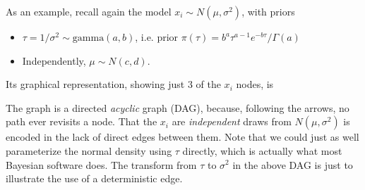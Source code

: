 \documentclass[10pt] {article}
\newcommand{\eps}[3]
{{\begin{center}
 \rotatebox{#1}{\scalebox{#2}{\texttt{[image: \#3]}}}
 \end{center}}
}
\theoremstyle{definition}
\begin{document}
\noindent As an example, recall again the model $x_i \sim N(\mu, \sigma^2)$, with priors
\begin{itemize}
\item $\tau = 1/\sigma^2 \sim \text{gamma}(a,b)$, i.e. prior $\pi(\tau) = b^a \tau^{a-1} e^{-b\tau}/\Gamma(a)$ 
\item Independently, $\mu \sim N(c,d)$.
\end{itemize}
Its graphical representation, showing just 3 of the $x_i $ nodes, is 
\eps{-90}{.5}{norm-dag.eps}
\noindent The graph is a directed {\em acyclic } graph (DAG), because, following the arrows, no path ever revisits a node.
That the $x_i$ are {\em independent} draws from $ N(\mu, \sigma^2)$ is encoded in the lack of direct edges between them. Note that we could just as well parameterize the normal density using $\tau$ directly, which is actually what most Bayesian software does. The transform from $\tau$ to $\sigma^2$ in the above DAG is just to illustrate the use of a deterministic edge. 
\end{document}
